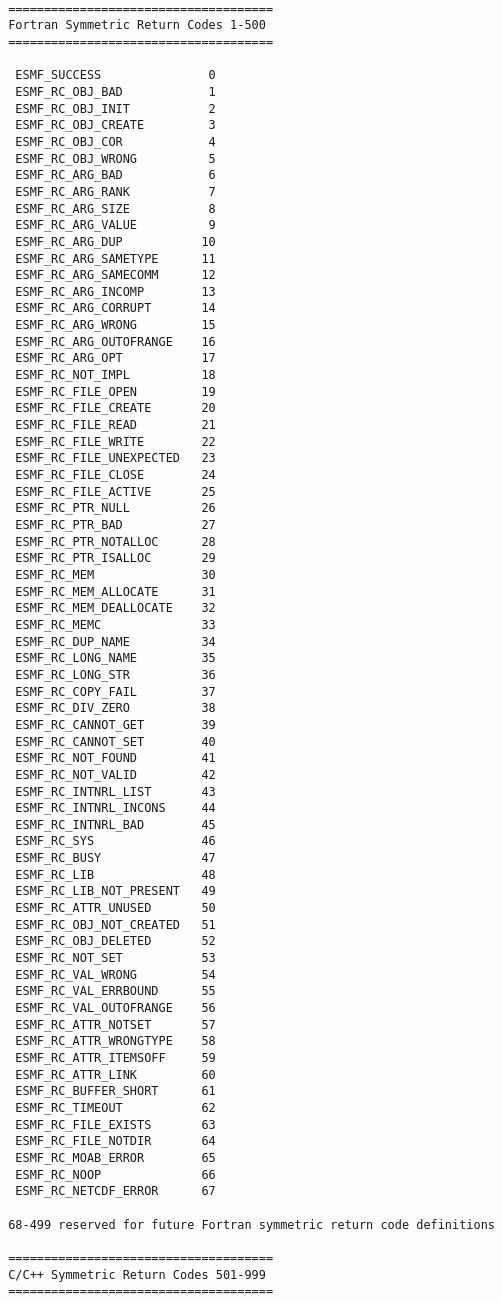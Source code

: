  \begin{verbatim}
 
 =====================================
 Fortran Symmetric Return Codes 1-500
 =====================================
 
  ESMF_SUCCESS               0
  ESMF_RC_OBJ_BAD            1
  ESMF_RC_OBJ_INIT           2
  ESMF_RC_OBJ_CREATE         3
  ESMF_RC_OBJ_COR            4
  ESMF_RC_OBJ_WRONG          5
  ESMF_RC_ARG_BAD            6
  ESMF_RC_ARG_RANK           7
  ESMF_RC_ARG_SIZE           8
  ESMF_RC_ARG_VALUE          9
  ESMF_RC_ARG_DUP           10
  ESMF_RC_ARG_SAMETYPE      11
  ESMF_RC_ARG_SAMECOMM      12
  ESMF_RC_ARG_INCOMP        13
  ESMF_RC_ARG_CORRUPT       14
  ESMF_RC_ARG_WRONG         15
  ESMF_RC_ARG_OUTOFRANGE    16
  ESMF_RC_ARG_OPT           17
  ESMF_RC_NOT_IMPL          18
  ESMF_RC_FILE_OPEN         19
  ESMF_RC_FILE_CREATE       20
  ESMF_RC_FILE_READ         21
  ESMF_RC_FILE_WRITE        22
  ESMF_RC_FILE_UNEXPECTED   23
  ESMF_RC_FILE_CLOSE        24
  ESMF_RC_FILE_ACTIVE       25
  ESMF_RC_PTR_NULL          26
  ESMF_RC_PTR_BAD           27
  ESMF_RC_PTR_NOTALLOC      28
  ESMF_RC_PTR_ISALLOC       29
  ESMF_RC_MEM               30
  ESMF_RC_MEM_ALLOCATE      31
  ESMF_RC_MEM_DEALLOCATE    32
  ESMF_RC_MEMC              33
  ESMF_RC_DUP_NAME          34
  ESMF_RC_LONG_NAME         35
  ESMF_RC_LONG_STR          36
  ESMF_RC_COPY_FAIL         37
  ESMF_RC_DIV_ZERO          38
  ESMF_RC_CANNOT_GET        39
  ESMF_RC_CANNOT_SET        40
  ESMF_RC_NOT_FOUND         41
  ESMF_RC_NOT_VALID         42
  ESMF_RC_INTNRL_LIST       43
  ESMF_RC_INTNRL_INCONS     44
  ESMF_RC_INTNRL_BAD        45
  ESMF_RC_SYS               46
  ESMF_RC_BUSY              47
  ESMF_RC_LIB               48
  ESMF_RC_LIB_NOT_PRESENT   49
  ESMF_RC_ATTR_UNUSED       50
  ESMF_RC_OBJ_NOT_CREATED   51
  ESMF_RC_OBJ_DELETED       52
  ESMF_RC_NOT_SET           53
  ESMF_RC_VAL_WRONG         54
  ESMF_RC_VAL_ERRBOUND      55
  ESMF_RC_VAL_OUTOFRANGE    56
  ESMF_RC_ATTR_NOTSET       57
  ESMF_RC_ATTR_WRONGTYPE    58
  ESMF_RC_ATTR_ITEMSOFF     59
  ESMF_RC_ATTR_LINK         60
  ESMF_RC_BUFFER_SHORT      61
  ESMF_RC_TIMEOUT           62
  ESMF_RC_FILE_EXISTS       63
  ESMF_RC_FILE_NOTDIR       64
  ESMF_RC_MOAB_ERROR        65
  ESMF_RC_NOOP              66
  ESMF_RC_NETCDF_ERROR      67
 
 68-499 reserved for future Fortran symmetric return code definitions
 
 =====================================
 C/C++ Symmetric Return Codes 501-999
 =====================================
 

\end{verbatim}
